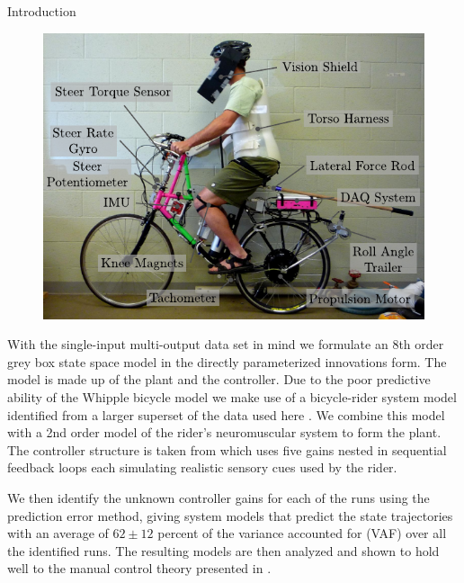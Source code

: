 \documentclass[final]{beamer}
\newlength{\onecolwid}
\begin{document}
{\begin{center}
\begin{columns}[t]
\begin{column}{\onecolwid}
\begin{block}{Introduction}
{      \begin{figure}[h]
        \begin{center}
          \includegraphics[width=6.5in]{figures/instrumented-bicycle.pdf}
          \caption{}
        \label{fig:Eig}
        \end{center}
      \end{figure}

      With the single-input multi-output data set in mind we formulate an 8th
      order grey box state space model \cite{Ljung1999} in the directly
      parameterized innovations form. The model is made up of the plant and the
      controller. Due to the poor predictive ability of the Whipple bicycle
      model we make use of a bicycle-rider system model identified from a
      larger superset of the data used here \cite{Moore2012}. We combine this
      model with a 2nd order model of the rider's neuromuscular system to form
      the plant. The controller structure is taken from \cite{Hess2012} which
      uses five gains nested in sequential feedback loops each simulating
      realistic sensory cues used by the rider.

      We then identify the unknown controller gains for each of the runs using
      the prediction error method, giving system models that predict the state
      trajectories with an average of $62 \pm 12$ percent of the variance
      accounted for (VAF) over all the identified runs. The resulting models
      are then analyzed and shown to hold well to the manual control theory
      presented in \cite{Hess2012}.
    } %
  \end{block}


\end{column}
\end{columns}
\end{center}}
\end{document}
